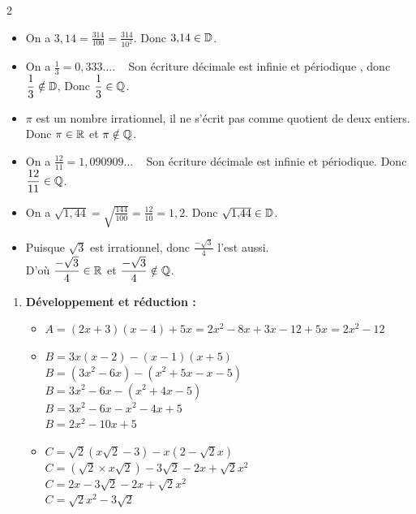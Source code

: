 \documentclass[10pt, a4paper]{article}
\begin{document}
\begin{multicols*}{2}
\begin{Solution}[APPLICATION][1]
\begin{enumerate}
\begin{itemize}
\item On a $3{,}14 = \frac{314}{100} = \frac{314}{10^2}$. Donc $3{,}14 \in \mathbb{D}$.

\item On a $\frac{1}{3} = 0{,}333\ldots$. ~ Son écriture décimale est infinie et périodique , donc $\dfrac{1}{3} \notin \mathbb{D}$, 
Donc $\dfrac{1}{3} \in \mathbb{Q}$.

\item $\pi$ est un nombre irrationnel, il ne s'écrit pas comme quotient de deux entiers. Donc $\pi \in \mathbb{R}$ et $\pi \notin \mathbb{Q}$.

\item On a $\frac{12}{11} = 1{,}090909 ... $ ~ Son écriture décimale est infinie et périodique. Donc $\dfrac{12}{11} \in \mathbb{Q}$.

\item On a $\sqrt{1{,}44} = \sqrt{\frac{144}{100}} = \frac{12}{10} = 1{,}2$. Donc $\sqrt{1{,}44} \in \mathbb{D}$.

\item Puisque $\sqrt{3}$ est irrationnel, donc $\frac{-\sqrt{3}}{4}$ l'est aussi. \\
D'où $\dfrac{-\sqrt{3}}{4} \in \mathbb{R}$ et $\dfrac{-\sqrt{3}}{4} \notin \mathbb{Q}$.
\end{itemize}
\end{enumerate}
\end{Solution}

\columnbreak

\begin{Solution}[APPLICATION][2]
\begin{enumerate}
    \item \textbf{Développement et réduction :}
    \begin{itemize}
        \item $A = (2x + 3)(x - 4) + 5x = 2x^2 - 8x + 3x - 12 + 5x = 2x^2 - 12$
        
        \item $B = 3x(x - 2) - (x - 1)(x + 5)$ \\
        $B = (3x^2 - 6x) - (x^2 + 5x - x - 5)$ \\
        $B = 3x^2 - 6x - (x^2 + 4x - 5)$ \\
        $B = 3x^2 - 6x - x^2 - 4x + 5$ \\
        $B = 2x^2 - 10x + 5$
        
        \item $C = \sqrt{2}(x\sqrt{2} - 3) - x(2 - \sqrt{2}x)$ \\
        $C = (\sqrt{2} \times x\sqrt{2}) - 3\sqrt{2} - 2x + \sqrt{2}x^2$ \\
        $C = 2x - 3\sqrt{2} - 2x + \sqrt{2}x^2$ \\
        $C = \sqrt{2}x^2 - 3\sqrt{2}$
    \end{itemize}


\end{enumerate}
\end{Solution}
\end{multicols*}
\end{document}
